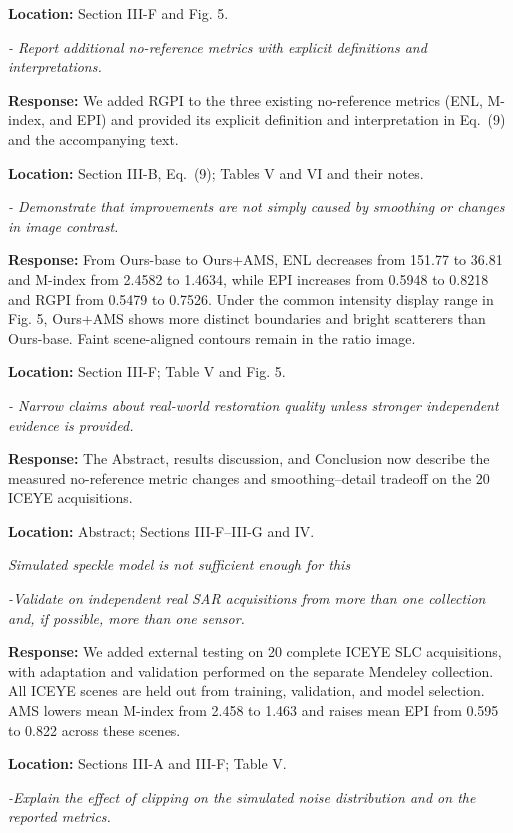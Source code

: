 \documentclass[11pt,letterpaper]{article}
\newcommand{\reviewgroup}[1]{%
  \Needspace{5\baselineskip}%
  \medskip\textit{#1}\par
}
\begin{document}
\textbf{Location:} Section III-F and Fig. 5.

\textit{- Report additional no-reference metrics with explicit definitions and interpretations.}

\textbf{Response:} We added RGPI to the three existing no-reference metrics (ENL, M-index, and EPI) and provided its explicit definition and interpretation in Eq.~(9) and the accompanying text.

\textbf{Location:} Section III-B, Eq.~(9); Tables V and VI and their notes.

\textit{- Demonstrate that improvements are not simply caused by smoothing or changes in image contrast.}

\textbf{Response:} From Ours-base to Ours+AMS, ENL decreases from 151.77 to 36.81 and M-index from 2.4582 to 1.4634, while EPI increases from 0.5948 to 0.8218 and RGPI from 0.5479 to 0.7526. Under the common intensity display range in Fig. 5, Ours+AMS shows more distinct boundaries and bright scatterers than Ours-base. Faint scene-aligned contours remain in the ratio image.

\textbf{Location:} Section III-F; Table V and Fig. 5.

\textit{- Narrow claims about real-world restoration quality unless stronger independent evidence is provided.}

\textbf{Response:} The Abstract, results discussion, and Conclusion now describe the measured no-reference metric changes and smoothing--detail tradeoff on the 20 ICEYE acquisitions.

\textbf{Location:} Abstract; Sections III-F--III-G and IV.

\reviewgroup{Simulated speckle model is not sufficient enough for this}

\textit{-Validate on independent real SAR acquisitions from more than one collection and, if possible, more than one sensor.}

\textbf{Response:} We added external testing on 20 complete ICEYE SLC acquisitions, with adaptation and validation performed on the separate Mendeley collection. All ICEYE scenes are held out from training, validation, and model selection. AMS lowers mean M-index from 2.458 to 1.463 and raises mean EPI from 0.595 to 0.822 across these scenes.

\textbf{Location:} Sections III-A and III-F; Table V.

\textit{-Explain the effect of clipping on the simulated noise distribution and on the reported metrics.}
\end{document}
